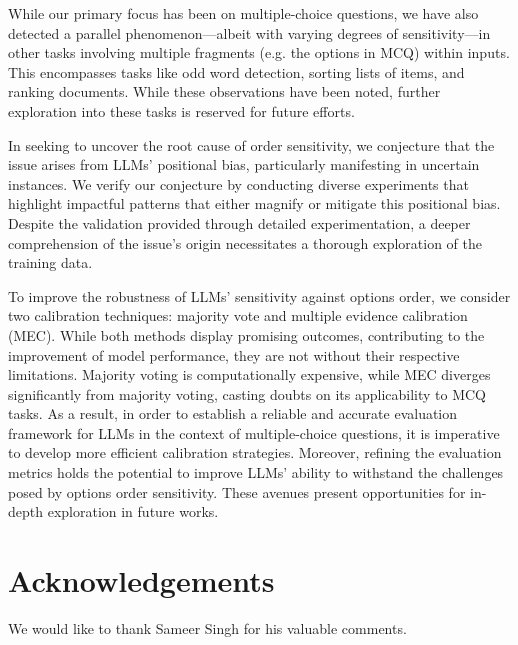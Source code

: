 \documentclass[11pt]{article}
\begin{document}
While our primary focus has been on multiple-choice questions, we have also detected a parallel phenomenon—albeit with varying degrees of sensitivity—in other tasks involving multiple fragments (e.g. the options in MCQ) within inputs. 
This encompasses tasks like odd word detection, sorting lists of items, and ranking documents. While these observations have been noted, further exploration into these tasks is reserved for future efforts.

In seeking to uncover the root cause of order sensitivity, we conjecture that the issue arises from LLMs' positional bias, particularly manifesting in uncertain instances. 
We verify our conjecture by conducting diverse experiments that highlight impactful patterns that either magnify or mitigate this positional bias. 
Despite the validation provided through detailed experimentation, a deeper comprehension of the issue's origin necessitates a thorough exploration of the training data.

To improve the robustness of LLMs' sensitivity against options order, we consider two calibration techniques: majority vote and multiple evidence calibration (MEC). 
While both methods display promising outcomes, contributing to the improvement of model performance, they are not without their respective limitations. 
Majority voting is computationally expensive, while MEC diverges significantly from majority voting, casting doubts on its applicability to MCQ tasks.
As a result, in order to establish a reliable and accurate evaluation framework for LLMs in the context of multiple-choice questions, it is imperative to develop more efficient calibration strategies. Moreover, refining the evaluation metrics holds the potential to improve LLMs' ability to withstand the challenges posed by options order sensitivity. These avenues present opportunities for in-depth exploration in future works.


\section*{Acknowledgements}
We would like to thank Sameer Singh for his valuable comments. 
\end{document}
